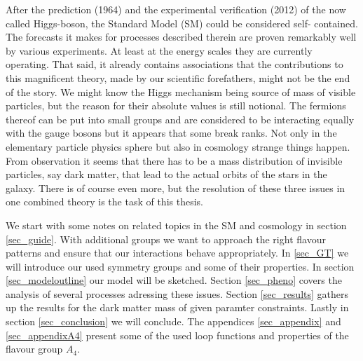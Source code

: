 After the prediction (1964) and the experimental verification (2012) of the
now called Higgs-boson, the Standard Model (SM) could be considered self-
contained. The forecasts it makes for processes described therein are proven
remarkably well by various experiments. At least at the energy scales they
are currently operating. That said, it already contains associations that the
contributions to this magnificent theory, made by our scientific forefathers, might not be
the end of the story. We might know the Higgs mechanism being source of mass of visible particles,
but the reason for their absolute values is still notional. The fermions thereof can be put into
small groups and are considered to be interacting equally with the gauge bosons but it appears
that some break ranks. Not only in the elementary particle physics sphere but also in cosmology
strange things happen. From observation it seems that there has to be a mass distribution of
invisible particles, say dark matter, that lead to the actual orbits of the stars in the galaxy.
There is of course even more, but the resolution of these three issues in one combined theory is
the task of this thesis.

\noindent We start with some notes on 
related topics in the SM and cosmology in section \ref{sec_guide}. With additional groups we want
to approach the right flavour patterns and ensure that our interactions behave appropriately. In \ref{sec_GT} 
we will introduce our used symmetry groups and some of their properties. In section \ref{sec_modeloutline} our model
will be sketched. Section \ref{sec_pheno} covers the analysis of several processes adressing these issues. 
Section \ref{sec_results} gathers up the results for the dark matter mass of given paramter constraints.
Lastly in section \ref{sec_conclusion} we will conclude. The appendices \ref{sec_appendix} and \ref{sec_appendixA4} present some of
the used loop functions and properties of the flavour group $A_4$.
